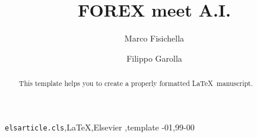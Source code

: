 \documentclass[1p]{elsarticle}
\begin{document}
\begin{frontmatter}

\title{FOREX meet A.I.}


\author[l3s_address]{Marco Fisichella}

\author[filippoaddress]{Filippo Garolla}


\address[l3saddress]{L3S Research Center of Leibniz University of Hannover, Germany}
\address[filippoaddress]{Austria}

\begin{abstract}
This template helps you to create a properly formatted \LaTeX\ manuscript.
\end{abstract}

\begin{keyword}
\texttt{elsarticle.cls}\sep \LaTeX\sep Elsevier \sep template
-01\sep  99-00
\end{keyword}

\end{frontmatter}



















\end{document}
